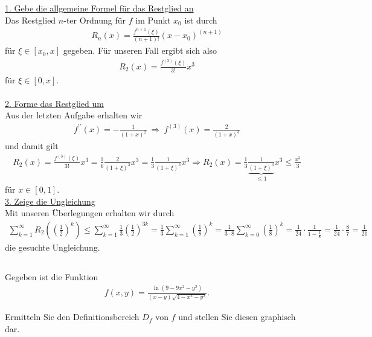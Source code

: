 \underline{1. Gebe die allgemeine Formel für das Restglied an}\\
Das Restglied $ n $-ter Ordnung für $ f $ im Punkt $ x_0 $ ist durch
\begin{align*}
R_n(x) = \frac{f^{n+1}(\xi)}{(n+1)!}(x - x_0)^{(n+1)} 
\end{align*}
für $ \xi \in [x_0,x] $ gegeben. Für unseren Fall ergibt sich also
\begin{align*}
R_2(x) = \frac{f^{(3)}(\xi)}{3!} x^3
\end{align*}
für $ \xi \in [0,x] $.
\\
\\

\underline{2. Forme das Restglied um}\\
Aus der letzten Aufgabe erhalten wir
\begin{align*}
f^{\prime \prime}(x) = - \frac{1}{(1+x)^2}
\
\Rightarrow
\
f^{(3)}(x) = \frac{2}{(1+x)^3}
\end{align*}
und damit gilt
\begin{align*}
R_2(x) = \frac{f^{(3)}(\xi)}{3!} x^3 = \frac{1}{6} \frac{2}{(1+\xi)^3} x^3
=
\frac{1}{3} \frac{1}{(1+\xi)^3} x^3
\Rightarrow
R_2(x) = \frac{1}{3} \underbrace{\frac{1}{(1+\xi)^3}}_{\leq 1} x^3
\leq 
\frac{x^3}{3}
\end{align*}
für $ x \in [0,1] $.
\\

\underline{3. Zeige die Ungleichung}\\
Mit unseren Überlegungen erhalten wir durch
\begin{align*}
\sum \limits_{k=1}^\infty R_2 \left( \left( \frac{1}{2}\right)^k \right)
\leq 
\sum \limits_{k=1}^\infty \frac{1}{3} \left( \frac{1}{2}\right)^{3k}
=
\frac{1}{3} \sum \limits_{k=1}^\infty  \left( \frac{1}{8}\right)^{k}
=
\frac{1}{3 \cdot 8} 
\sum \limits_{k=0}^\infty  \left( \frac{1}{8}\right)^{k}
=
\frac{1}{24} \cdot \frac{1}{1 - \frac{1}{8}}
=
\frac{1}{24} \cdot \frac{8}{7} = \frac{1}{21}
\end{align*} 
die gesuchte Ungleichung.


\subsection*{}
Gegeben ist die Funktion 
\begin{align*}
f(x,y)
=
\frac{\ln(9 - 9 x^2 - y^2)}{(x-y) \sqrt{4 - x^2 - y^2}}.
\end{align*}

Ermitteln Sie den Definitionsbereich $ D_f $ von $ f $ und stellen Sie diesen graphisch dar.
\\
\\

